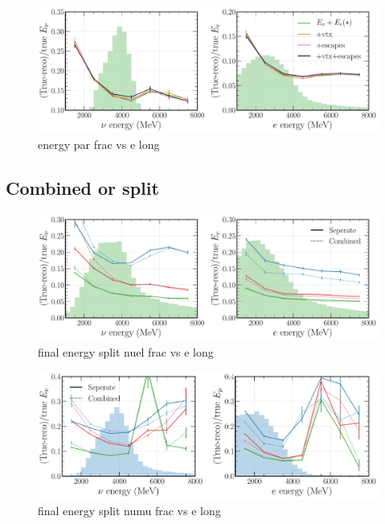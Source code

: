 \begin{figure} %
    \includegraphics[width=\textwidth]{diagrams/7-cvn/chipsnet/energy_par_frac_vs_e.pdf}
    \caption[energy par frac vs e short]
    {energy par frac vs e long}
    \label{fig:energy_par_frac_vs_e}
\end{figure}

\subsection{Combined or split} %
\label{sec:cvn_energy_split} %

\begin{figure} %
    \includegraphics[width=\textwidth]{diagrams/7-cvn/chipsnet/final_energy_split_nuel_frac_vs_e.pdf}
    \caption[final energy split nuel frac vs e short]
    {final energy split nuel frac vs e long}
    \label{fig:final_energy_split_nuel_frac_vs_e}
\end{figure}

\begin{figure} %
    \includegraphics[width=\textwidth]{diagrams/7-cvn/chipsnet/final_energy_split_numu_frac_vs_e.pdf}
    \caption[final energy split numu frac vs e short]
    {final energy split numu frac vs e long}
    \label{fig:final_energy_split_numu_frac_vs_e}
\end{figure}

